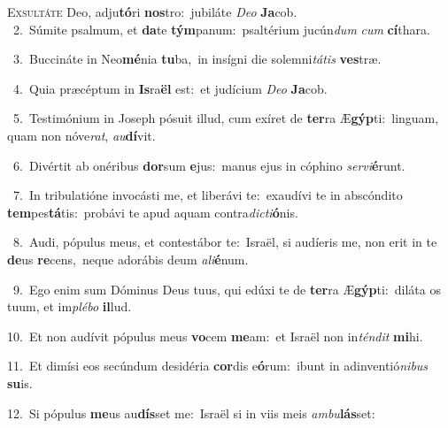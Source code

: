 \lettrine{\initial\textcolor{\initialcolor}{E}}{xsultáte} Deo, adju\-\textbf{tó}\-ri \textbf{nos}\-tro:~\star jubiláte \textit{De}\-\textit{o} \textbf{Ja}\-cob.\\
{\numbfont\textcolor{\numbcolor}{~2.}}~Súmite psalmum, et \textbf{da}\-te \textbf{tým}\-panum:~\star psaltérium jucún\textit{dum} \textit{cum} \textbf{cí}\-thara.\par
{\numbfont\textcolor{\numbcolor}{~3.}}~Buccináte in Neo\-\textbf{mé}\-nia \textbf{tu}\-ba,~\star in insígni die solemni\-\textit{tá}\-\textit{tis} \textbf{ves}\-træ.\par
{\numbfont\textcolor{\numbcolor}{~4.}}~Quia præcéptum in \textbf{Is}\-ra\textbf{ël} est:~\star et judícium \textit{De}\-\textit{o} \textbf{Ja}\-cob.\par
{\numbfont\textcolor{\numbcolor}{~5.}}~Testimónium in Joseph pósuit illud, cum exíret de \textbf{ter}\-ra Æ\-\textbf{gýp}\-ti:~\star linguam, quam non nóve\-\textit{rat}\-, \textit{au}\-\textbf{dí}vit.\par
{\numbfont\textcolor{\numbcolor}{~6.}}~Divértit ab onéribus \textbf{dor}\-sum \textbf{e}\-jus:~\star manus ejus in cóphino \textit{ser}\-\textit{vi}\textbf{é}runt.\par
{\numbfont\textcolor{\numbcolor}{~7.}}~In tribulatióne invocásti me, et liberávi te:~\dagger exaudívi te in abscóndito \textbf{tem}\-pes\-\textbf{tá}\-tis:~\star probávi te apud aquam contra\-\textit{dic}\-\textit{ti}\textbf{ó}nis.\par
{\numbfont\textcolor{\numbcolor}{~8.}}~Audi, pópulus meus, et contestábor te:~\dagger Israël, si audíeris me, non erit in te \textbf{de}\-us \textbf{re}\-cens,~\star neque adorábis deum \textit{a}\-\textit{li}\textbf{é}num.\par
{\numbfont\textcolor{\numbcolor}{~9.}}~Ego enim sum Dóminus Deus tuus, qui edúxi te de \textbf{ter}\-ra Æ\-\textbf{gýp}\-ti:~\star diláta os tuum, et im\-\textit{plé}\-\textit{bo} \textbf{il}\-lud.\par
{\numbfont\textcolor{\numbcolor}{10.}}~Et non audívit pópulus meus \textbf{vo}\-cem \textbf{me}\-am:~\star et Israël non in\-\textit{tén}\-\textit{dit} \textbf{mi}\-hi.\par
{\numbfont\textcolor{\numbcolor}{11.}}~Et dimísi eos secúndum desidéria \textbf{cor}\-dis e\-\textbf{ó}\-rum:~\star ibunt in adinventió\-\textit{ni}\-\textit{bus} \textbf{su}\-is.\par
{\numbfont\textcolor{\numbcolor}{12.}}~Si pópulus \textbf{me}\-us au\-\textbf{dís}\-set me:~\star Israël si in viis meis \textit{am}\-\textit{bu}\textbf{lás}set:\par
